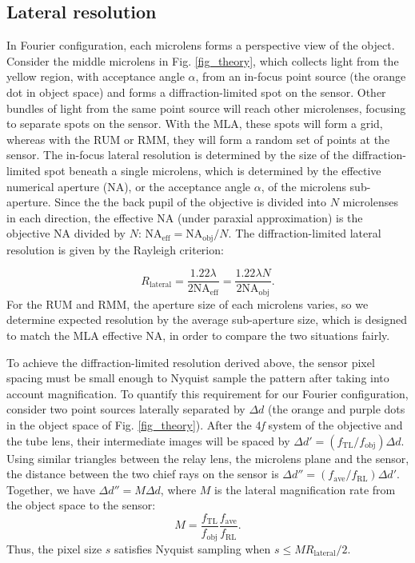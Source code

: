 \documentclass{osa-article}
\begin{document}
\subsection{Lateral resolution}
\label{section_lres}
In Fourier configuration, each microlens forms a perspective view of the object. Consider the middle microlens in Fig. \ref{fig_theory}, which collects light from the yellow region, with acceptance angle $\alpha$, from an in-focus point source (the orange dot in object space) and forms a diffraction-limited spot on the sensor. Other bundles of light from the same point source will reach other microlenses, focusing to separate spots on the sensor. With the MLA, these spots will form a grid, whereas with the RUM or RMM, they will form a random set of points at the sensor. The in-focus lateral resolution is determined by the size of the diffraction-limited spot beneath a single microlens, which is determined by the effective numerical aperture (NA), or the acceptance angle $\alpha$, of the microlens sub-aperture. Since the the back pupil of the objective is divided into $N$ microlenses in each direction, the effective NA (under paraxial approximation) is the objective NA divided by $N$: $\text{NA}_\text{eff} = \text{NA}_\text{obj} / N $. The diffraction-limited lateral resolution is given by the Rayleigh criterion:

\begin{equation}
\label{eq_lres}
R_\mathrm{lateral} = \frac{1.22 \lambda }{2 \text{NA}_{\text{eff}}}  = \frac{1.22 \lambda N}{2 \text{NA}_{\text{obj}}}  .
\end{equation}
For the RUM and RMM, the aperture size of each microlens varies, so we determine expected resolution by the average sub-aperture size, which is designed to match the MLA effective NA, in order to compare the two situations fairly. 

To achieve the diffraction-limited resolution derived above, the sensor pixel spacing must be small enough to Nyquist sample the pattern after taking into account magnification. To quantify this requirement for our Fourier configuration, consider two point sources laterally separated by $\Delta d$ (the orange and purple dots in the object space of Fig. \ref{fig_theory}). After the 4\textit{f} system of the objective and the tube lens, their intermediate images will be spaced by $\Delta d' = ( f_\mathrm{TL} / f_\mathrm{obj} ) \Delta d $. Using similar triangles between the relay lens, the microlens plane and the sensor, the distance between the two chief rays on the sensor is $\Delta d'' = (f_{\mathrm{ave}} / f_\mathrm{RL} )\Delta d' $. Together, we have $\Delta d'' = M \Delta d $, where $M$ is the lateral magnification rate from the object space to the sensor: 
\begin{equation}
\label{eq_mag}
M =   \frac{f_\mathrm{TL}}{f_\mathrm{obj}} \frac{f_{\mathrm{ave}}}{f_\mathrm{RL}} .
\end{equation}
Thus, the pixel size $s$ satisfies Nyquist sampling when $s \leq M R_\mathrm{lateral} /2$.
\end{document}
